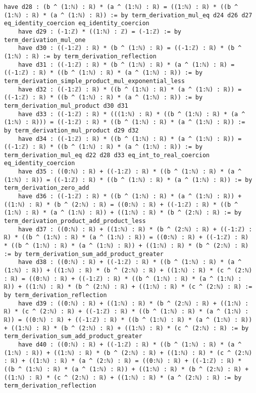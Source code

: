 \documentclass{article}
\begin{document}
\begin{tcolorbox}[colback=white!10, width=\linewidth]
\begin{lstlisting}[language=Lean4]
    have d28 : (b ^ (1:ℕ) : ℝ) * (a ^ (1:ℕ) : ℝ) = ((1:ℕ) : ℝ) * ((b ^ (1:ℕ) : ℝ) * (a ^ (1:ℕ) : ℝ)) := by term_derivation_mul_eq d24 d26 d27 eq_identity_coercion eq_identity_coercion
    have d29 : (-1:ℤ) * ((1:ℕ) : ℤ) = (-1:ℤ) := by term_derivation_mul_one
    have d30 : ((-1:ℤ) : ℝ) * (b ^ (1:ℕ) : ℝ) = ((-1:ℤ) : ℝ) * (b ^ (1:ℕ) : ℝ) := by term_derivation_reflection
    have d31 : ((-1:ℤ) : ℝ) * (b ^ (1:ℕ) : ℝ) * (a ^ (1:ℕ) : ℝ) = ((-1:ℤ) : ℝ) * ((b ^ (1:ℕ) : ℝ) * (a ^ (1:ℕ) : ℝ)) := by term_derivation_simple_product_mul_exponential_less
    have d32 : ((-1:ℤ) : ℝ) * ((b ^ (1:ℕ) : ℝ) * (a ^ (1:ℕ) : ℝ)) = ((-1:ℤ) : ℝ) * ((b ^ (1:ℕ) : ℝ) * (a ^ (1:ℕ) : ℝ)) := by term_derivation_mul_product d30 d31
    have d33 : ((-1:ℤ) : ℝ) * (((1:ℕ) : ℝ) * ((b ^ (1:ℕ) : ℝ) * (a ^ (1:ℕ) : ℝ))) = ((-1:ℤ) : ℝ) * ((b ^ (1:ℕ) : ℝ) * (a ^ (1:ℕ) : ℝ)) := by term_derivation_mul_product d29 d32
    have d34 : ((-1:ℤ) : ℝ) * ((b ^ (1:ℕ) : ℝ) * (a ^ (1:ℕ) : ℝ)) = ((-1:ℤ) : ℝ) * ((b ^ (1:ℕ) : ℝ) * (a ^ (1:ℕ) : ℝ)) := by term_derivation_mul_eq d22 d28 d33 eq_int_to_real_coercion eq_identity_coercion
    have d35 : ((0:ℕ) : ℝ) + ((-1:ℤ) : ℝ) * ((b ^ (1:ℕ) : ℝ) * (a ^ (1:ℕ) : ℝ)) = ((-1:ℤ) : ℝ) * ((b ^ (1:ℕ) : ℝ) * (a ^ (1:ℕ) : ℝ)) := by term_derivation_zero_add
    have d36 : ((-1:ℤ) : ℝ) * ((b ^ (1:ℕ) : ℝ) * (a ^ (1:ℕ) : ℝ)) + ((1:ℕ) : ℝ) * (b ^ (2:ℕ) : ℝ) = ((0:ℕ) : ℝ) + ((-1:ℤ) : ℝ) * ((b ^ (1:ℕ) : ℝ) * (a ^ (1:ℕ) : ℝ)) + ((1:ℕ) : ℝ) * (b ^ (2:ℕ) : ℝ) := by term_derivation_product_add_product_less
    have d37 : ((0:ℕ) : ℝ) + ((1:ℕ) : ℝ) * (b ^ (2:ℕ) : ℝ) + ((-1:ℤ) : ℝ) * ((b ^ (1:ℕ) : ℝ) * (a ^ (1:ℕ) : ℝ)) = ((0:ℕ) : ℝ) + ((-1:ℤ) : ℝ) * ((b ^ (1:ℕ) : ℝ) * (a ^ (1:ℕ) : ℝ)) + ((1:ℕ) : ℝ) * (b ^ (2:ℕ) : ℝ) := by term_derivation_sum_add_product_greater
    have d38 : ((0:ℕ) : ℝ) + ((-1:ℤ) : ℝ) * ((b ^ (1:ℕ) : ℝ) * (a ^ (1:ℕ) : ℝ)) + ((1:ℕ) : ℝ) * (b ^ (2:ℕ) : ℝ) + ((1:ℕ) : ℝ) * (c ^ (2:ℕ) : ℝ) = ((0:ℕ) : ℝ) + ((-1:ℤ) : ℝ) * ((b ^ (1:ℕ) : ℝ) * (a ^ (1:ℕ) : ℝ)) + ((1:ℕ) : ℝ) * (b ^ (2:ℕ) : ℝ) + ((1:ℕ) : ℝ) * (c ^ (2:ℕ) : ℝ) := by term_derivation_reflection
    have d39 : ((0:ℕ) : ℝ) + ((1:ℕ) : ℝ) * (b ^ (2:ℕ) : ℝ) + ((1:ℕ) : ℝ) * (c ^ (2:ℕ) : ℝ) + ((-1:ℤ) : ℝ) * ((b ^ (1:ℕ) : ℝ) * (a ^ (1:ℕ) : ℝ)) = ((0:ℕ) : ℝ) + ((-1:ℤ) : ℝ) * ((b ^ (1:ℕ) : ℝ) * (a ^ (1:ℕ) : ℝ)) + ((1:ℕ) : ℝ) * (b ^ (2:ℕ) : ℝ) + ((1:ℕ) : ℝ) * (c ^ (2:ℕ) : ℝ) := by term_derivation_sum_add_product_greater
    have d40 : ((0:ℕ) : ℝ) + ((-1:ℤ) : ℝ) * ((b ^ (1:ℕ) : ℝ) * (a ^ (1:ℕ) : ℝ)) + ((1:ℕ) : ℝ) * (b ^ (2:ℕ) : ℝ) + ((1:ℕ) : ℝ) * (c ^ (2:ℕ) : ℝ) + ((1:ℕ) : ℝ) * (a ^ (2:ℕ) : ℝ) = ((0:ℕ) : ℝ) + ((-1:ℤ) : ℝ) * ((b ^ (1:ℕ) : ℝ) * (a ^ (1:ℕ) : ℝ)) + ((1:ℕ) : ℝ) * (b ^ (2:ℕ) : ℝ) + ((1:ℕ) : ℝ) * (c ^ (2:ℕ) : ℝ) + ((1:ℕ) : ℝ) * (a ^ (2:ℕ) : ℝ) := by term_derivation_reflection

\end{lstlisting}
\end{tcolorbox}
\end{document}
